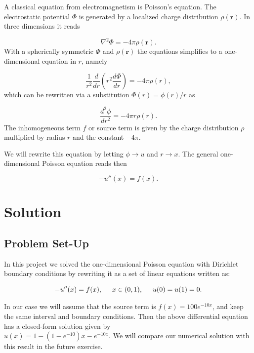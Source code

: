 \documentclass{article}
\begin{document}
		A classical equation from electromagnetism is Poisson's equation. The electrostatic potential $\Phi$ is generated by a localized charge distribution $\rho (\mathbf{r})$.   In three dimensions it reads
		
		\begin{equation*}
		\nabla^2 \Phi = -4\pi \rho (\mathbf{r}).
		\end{equation*}
		With a spherically symmetric $\Phi$ and $\rho (\mathbf{r})$  the equations
		simplifies to a one-dimensional equation in $r$, namely
		
		\begin{equation*}
		\frac{1}{r^2}\frac{d}{dr}\left(r^2\frac{d\Phi}{dr}\right) = -4\pi \rho(r),
		\end{equation*}
		which can be rewritten via a substitution $\Phi(r)= \phi(r)/r$ as
		
		\begin{equation*}
		\frac{d^2\phi}{dr^2}= -4\pi r\rho(r).
		\end{equation*}
		The inhomogeneous term $f$ or source term is given by the charge distribution
		$\rho$  multiplied by radius $r$ and the constant $-4\pi$.
		
		We will rewrite this equation by letting $\phi\rightarrow u$ and 
		$r\rightarrow x$. 
		The general one-dimensional Poisson equation reads then
		
		\begin{equation*}
		-u''(x) = f(x).
		\end{equation*}
		

\section{Solution}
\subsection{Problem Set-Up}
In this project we solved the one-dimensional Poisson equation with Dirichlet boundary conditions by rewriting it as a set of linear equations written as:

\begin{equation*}
-u''(x) = f(x), \hspace{0.5cm} x\in(0,1), \hspace{0.5cm} u(0) = u(1) = 0.
\end{equation*}

In our case we will assume  that the source term is 
$f(x) = 100e^{-10x}$, and keep the same interval and boundary  conditions. Then the above differential equation
has a closed-form  solution given by \\$u(x) = 1-(1-e^{-10})x-e^{-10x}$. We will compare
our numerical solution with this result in the future exercise.
\end{document}
